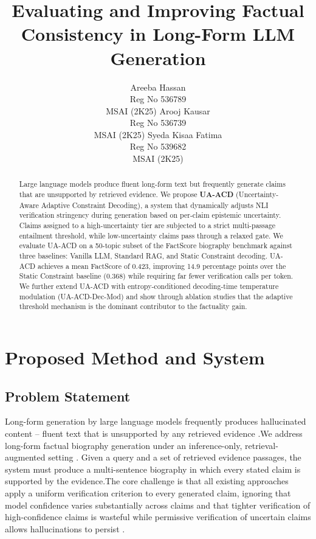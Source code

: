 \documentclass[11pt]{article}
\title{Evaluating and Improving Factual Consistency in Long-Form LLM Generation}
\author{Areeba Hassan \\
  Reg No 536789 \\
  {MSAI (2K25)}
\And
  Arooj Kausar \\
  Reg No 536739 \\
  {MSAI (2K25)}
\And
  Syeda Kisaa Fatima \\
 Reg No 539682 \\
 {MSAI (2K25)}
}
\begin{document}
\maketitle
\begin{abstract}
Large language models produce fluent long-form text but frequently generate claims that are unsupported by retrieved evidence. We propose \textbf{UA-ACD} (Uncertainty-Aware Adaptive Constraint Decoding), a system that dynamically adjusts NLI verification stringency during generation based on per-claim epistemic uncertainty. Claims assigned to a high-uncertainty tier are subjected to a strict multi-passage entailment threshold, while low-uncertainty claims pass through a relaxed gate. We evaluate UA-ACD on a 50-topic subset of the FactScore biography benchmark \citep{min2023factscore} against three baselines: Vanilla LLM, Standard RAG, and Static Constraint decoding. UA-ACD achieves a mean FactScore of 0.423, improving 14.9 percentage points over the Static Constraint baseline (0.368) while requiring far fewer verification calls per token. We further extend UA-ACD with entropy-conditioned decoding-time temperature modulation (UA-ACD-Dec-Mod) and show through ablation studies that the adaptive threshold mechanism is the dominant contributor to the factuality gain.
\end{abstract}

\section{Proposed Method and System}
\subsection{Problem Statement}
Long-form generation by large language models \citep{brown2020gpt3, touvron2023llama} frequently produces hallucinated content -- fluent text that is unsupported by any retrieved evidence \citep{ji2023survey}.We address long-form factual biography generation under an inference-only, retrieval-augmented setting \citep{lewis2020rag}. Given a query and a set of retrieved evidence passages, the system must produce a multi-sentence biography in which every stated claim is supported by the evidence.The core challenge is that all existing approaches apply a uniform verification criterion to every generated claim, ignoring that model confidence varies substantially across claims \citep{kadavath2022language} and that tighter verification of high-confidence claims is wasteful while permissive verification of uncertain claims allows hallucinations to persist \citep{manakul2023selfcheckgpt}.
\end{document}
